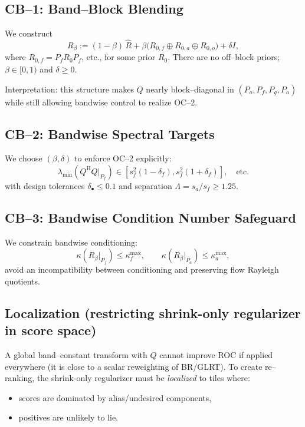 \documentclass[11pt]{article}
\newcommand{\wh}{\widehat}
\newcommand{\Hh}{^{\mathrm{H}}}
\newcommand{\Pf}{P_f}
\newcommand{\Pa}{P_a}
\newcommand{\Po}{P_o}
\newcommand{\Pg}{P_g}
\begin{document}
\subsection{CB--1: Band--Block Blending}

We construct
\[
R_\beta := (1-\beta)\,\wh R + \beta \bigl(R_{0,f}\oplus R_{0,a}\oplus R_{0,o}\bigr) + \delta I,
\]
where $R_{0,f} = \Pf R_0 \Pf$, etc., for some prior $R_0$. There are no off--block priors; $\beta\in[0,1)$ and $\delta\ge 0$.

Interpretation: this structure makes $Q$ nearly block--diagonal in $(\Po,\Pf,\Pg,\Pa)$ while still allowing bandwise control to realize OC--2.

\subsection{CB--2: Bandwise Spectral Targets}

We choose $(\beta,\delta)$ to enforce OC--2 explicitly:
\[
\lambda_{\min}(Q\Hh Q|_{\Pf}) \in [s_f^2(1-\delta_f), s_f^2(1+\delta_f)],\quad\text{etc.}
\]
with design tolerances $\delta_\bullet\le 0.1$ and separation $\Lambda = s_a/s_f \ge 1.25$.

\subsection{CB--3: Bandwise Condition Number Safeguard}

We constrain bandwise conditioning:
\[
\kappa(R_\beta|_{\Pf}) \le \kappa_f^{\max},\qquad
\kappa(R_\beta|_{\Pa}) \le \kappa_a^{\max},
\]
avoid an incompatibility between conditioning and preserving flow Rayleigh quotients.

\subsection{Localization (restricting shrink-only regularizer in score space)}
\label{app:gating}

A global band--constant transform with $Q$ cannot improve ROC if applied everywhere (it is close to a scalar reweighting of BR/GLRT). To create re--ranking, the shrink-only regularizer must be \emph{localized} to tiles where:
\begin{itemize}[nosep]
  \item scores are dominated by alias/undesired components,
  \item positives are unlikely to lie.
\end{itemize}
\end{document}
